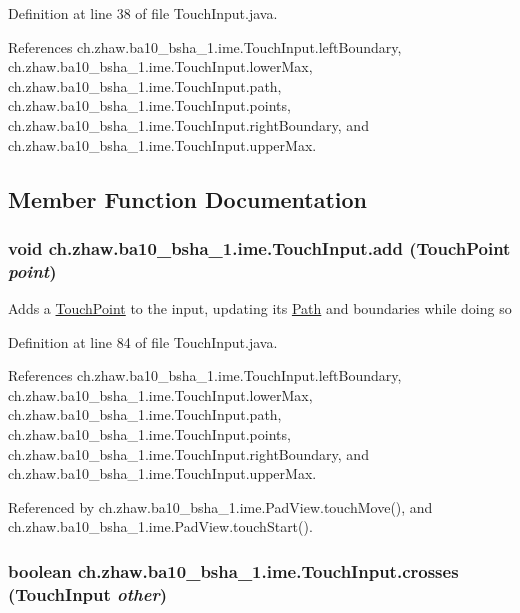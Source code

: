 Definition at line 38 of file TouchInput.java.

References ch.zhaw.ba10\_\-bsha\_\-1.ime.TouchInput.leftBoundary, ch.zhaw.ba10\_\-bsha\_\-1.ime.TouchInput.lowerMax, ch.zhaw.ba10\_\-bsha\_\-1.ime.TouchInput.path, ch.zhaw.ba10\_\-bsha\_\-1.ime.TouchInput.points, ch.zhaw.ba10\_\-bsha\_\-1.ime.TouchInput.rightBoundary, and ch.zhaw.ba10\_\-bsha\_\-1.ime.TouchInput.upperMax.

\subsection{Member Function Documentation}
\hypertarget{classch_1_1zhaw_1_1ba10__bsha__1_1_1ime_1_1TouchInput_a658d320b9d5c19adcbcd583476ef59e1}{
\subsubsection[{add}]{\setlength{\rightskip}{0pt plus 5cm}void ch.zhaw.ba10\_\-bsha\_\-1.ime.TouchInput.add ({\bf TouchPoint} {\em point})}}
\label{classch_1_1zhaw_1_1ba10__bsha__1_1_1ime_1_1TouchInput_a658d320b9d5c19adcbcd583476ef59e1}
Adds a \hyperlink{classch_1_1zhaw_1_1ba10__bsha__1_1_1TouchPoint}{TouchPoint} to the input, updating its \hyperlink{}{Path} and boundaries while doing so 

Definition at line 84 of file TouchInput.java.

References ch.zhaw.ba10\_\-bsha\_\-1.ime.TouchInput.leftBoundary, ch.zhaw.ba10\_\-bsha\_\-1.ime.TouchInput.lowerMax, ch.zhaw.ba10\_\-bsha\_\-1.ime.TouchInput.path, ch.zhaw.ba10\_\-bsha\_\-1.ime.TouchInput.points, ch.zhaw.ba10\_\-bsha\_\-1.ime.TouchInput.rightBoundary, and ch.zhaw.ba10\_\-bsha\_\-1.ime.TouchInput.upperMax.

Referenced by ch.zhaw.ba10\_\-bsha\_\-1.ime.PadView.touchMove(), and ch.zhaw.ba10\_\-bsha\_\-1.ime.PadView.touchStart().\hypertarget{classch_1_1zhaw_1_1ba10__bsha__1_1_1ime_1_1TouchInput_adb0a9fe73a2091ae7c3bdebe40be8a25}{
\subsubsection[{crosses}]{\setlength{\rightskip}{0pt plus 5cm}boolean ch.zhaw.ba10\_\-bsha\_\-1.ime.TouchInput.crosses ({\bf TouchInput} {\em other})}}
\label{classch_1_1zhaw_1_1ba10__bsha__1_1_1ime_1_1TouchInput_adb0a9fe73a2091ae7c3bdebe40be8a25}


